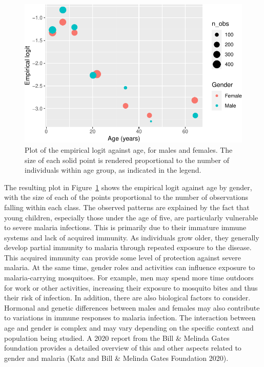 \documentclass[
  letterpaper,
]{krantz}
\begin{document}
\begin{figure}[H]

{\centering \includegraphics{03_model-fitting_files/figure-pdf/fig-elogit-age-malkenya-1.pdf}

}

\caption{\label{fig-elogit-age-malkenya}Plot of the empirical logit
against age, for males and females. The size of each solid point is
rendered proportional to the number of individuals within age group, as
indicated in the legend.}

\end{figure}

The resulting plot in Figure~\ref{fig-elogit-age-malkenya} shows the
empirical logit against age by gender, with the size of each of the
points proportional to the number of observations falling within each
class. The observed patterns are explained by the fact that young
children, especially those under the age of five, are particularly
vulnerable to severe malaria infections. This is primarily due to their
immature immune systems and lack of acquired immunity. As individuals
grow older, they generally develop partial immunity to malaria through
repeated exposure to the disease. This acquired immunity can provide
some level of protection against severe malaria. At the same time,
gender roles and activities can influence exposure to malaria-carrying
mosquitoes. For example, men may spend more time outdoors for work or
other activities, increasing their exposure to mosquito bites and thus
their risk of infection. In addition, there are also biological factors
to consider. Hormonal and genetic differences between males and females
may also contribute to variations in immune responses to malaria
infection. The interaction between age and gender is complex and may
vary depending on the specific context and population being studied. A
2020 report from the Bill \& Melinda Gates foundation provides a
detailed overview of this and other aspects related to gender and
malaria (Katz and Bill \& Melinda Gates Foundation 2020).
\end{document}
